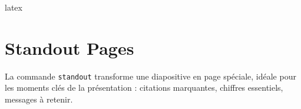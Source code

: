 \documentclass[english]{neoschool}
\begin{document}
\begin{code}{latex}


\end{code}

\section{Standout Pages}
La commande \texttt{standout} transforme une diapositive en page spéciale, idéale pour les moments clés de la présentation : citations marquantes, chiffres essentiels, messages à retenir.
\end{document}
